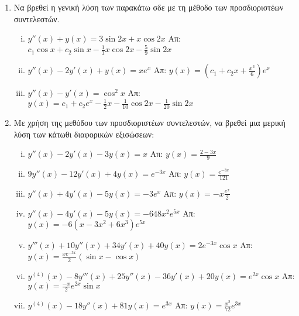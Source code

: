 



\everymath{\displaystyle}



\thispagestyle{empty}


\begin{center}
\end{center}

\vspace{\baselineskip}

\begin{enumerate}

\item Να βρεθεί η γενική λύση των παρακάτω σδε με τη μέθοδο των προσδιοριστέων συντελεστών.

\begin{enumerate}[i)]
  \item $y''(x)+y(x)=3\sin 2x + x\cos 2x$ \hfill Απ: $c_{1}\cos x+c_{2}\sin x-\frac{1}{3}x\cos 2x-\frac{5}{9}\sin 2x $
  \item $y''(x)-2y'(x)+y(x)=xe^{x}$ \hfill Απ:  $y(x)=(c_{1}+c_{2}x+\frac{x^{3}}{6})e^{x}$
  \item $y''(x)-y'(x)=\cos^{2}x$ \hfill Απ: $y(x) =c_{1}+c_{2}e^{x}-\frac{1}{2}x-\frac{1}{10}\cos 2x- \frac{1}{20}\sin 2x$

\end{enumerate}

\item Με χρήση της μεθόδου των προσδιοριστέων συντελεστών, να βρεθεί μια μερική λύση των κάτωθι διαφορικών εξισώσεων:

\begin{enumerate}[i)]
  \item $y''(x)-2y'(x)-3y(x)=x$ \hfill Απ: $y(x)=\frac{2-3x}{9}$
  \item $9y''(x)-12y'(x)+4y(x)=e^{-3x}$ \hfill Απ: $y(x)=\frac{e^{-3x}}{121}$
  \item $y''(x)+4y'(x)-5y(x)=-3e^{x}$ \hfill Απ: $y(x)=-x\frac{e^{x}}{2}$
  \item $y''(x)-4y'(x)-5y(x)=-648x^{2}e^{5x}$ \hfill Απ: $ y(x)=-6(x-3x^{2}+6x^{3})e^{5x}$
  \item $y'''(x)+10y''(x)+34y'(x)+40y(x)=2e^{-3x}\cos x$ \hfill Απ: $y(x)= \frac{xe^{-3x}}{2}(\sin x - \cos x)$
  \item $y^{(4)}(x)-8y'''(x)+25y''(x)-36y'(x)+20y(x)=e^{2x}\cos x$ \hfill Απ: $y(x) =\frac{-x}{2}e^{2x}\sin x$
  \item $y^{(4)}(x)-18y''(x)+81y(x)=e^{3x}$ \hfill Απ: $y(x)=\frac{x^{2}}{72}e^{3x}$


\end{enumerate}
\end{enumerate}
